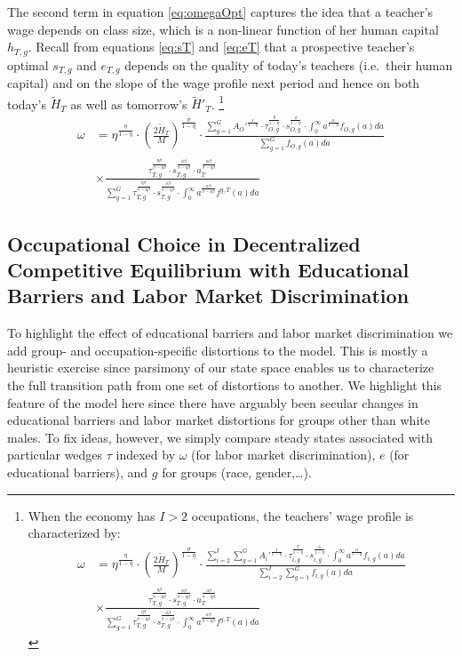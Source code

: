 \documentclass[onehalfspacing,11pt]{article}
\begin{document}
The second term in equation \eqref{eq:omegaOpt} captures the idea that a teacher's wage depends on class size, which is a non-linear function of her human capital $h_{T,g}$. Recall from equations \eqref{eq:sT} and \eqref{eq:eT} that a prospective teacher's optimal $s_{T,g}$ and $e_{T,g}$ depends on the quality of today's teachers (i.e.~their human capital) and on the slope of the wage profile next period and hence on both today's $ \widetilde{H}_{T}$ as well as tomorrow's $\widetilde{H}'_{T}$. \footnote{When the economy has $I>2$ occupations, the teachers' wage profile is characterized by:
\begin{align*}
\omega & = \eta^{\frac{\eta}{1-\eta}}\cdot \left(\tfrac{2\widetilde{H}_T}{M}\right)^{\frac{\sigma}{1-\eta}} \cdot \frac{\sum_{i=2}^I\sum_{g=1}^G {A_i'}^\frac{1}{1-\eta}\cdot\tau_{i,g}^\frac{\eta}{1-\eta} \cdot s_{i,g}^\frac{\phi}{1-\eta}\cdot \int_0^\infty a^{\frac{\alpha}{1-\eta}} f_{i,g}(a)da}{\sum_{i=2}^I\sum_{g=1}^G f_{i,g}(a)da} \nonumber\\
& \times \frac{\tau_{T,g}^\frac{\eta\beta}{\sigma-\eta\beta } \cdot s_{T,g}^\frac{\phi\beta }{\sigma-\eta\beta } \cdot a_T^\frac{\alpha\beta }{\sigma-\eta\beta}}{\sum_{g=1}^G \tau_{T,g}^\frac{\eta\beta }{\sigma-\eta\beta } \cdot s_{T,g}^\frac{\phi\beta }{\sigma-\eta\beta } \cdot \int_0^\infty a^\frac{\alpha\beta}{\sigma-\eta\beta } f^{g,T}(a)da}
\end{align*}
}
\begin{align}
\omega & = \eta^{\frac{\eta}{1-\eta}}\cdot \left(\tfrac{2\widetilde{H}_T}{M}\right)^{\frac{\sigma}{1-\eta}} \cdot \frac{\sum_{g=1}^G {A_O'}^\frac{1}{1-\eta}\cdot\tau_{O,g}^\frac{\eta}{1-\eta} \cdot s_{O,g}^\frac{\phi}{1-\eta}\cdot \int_0^\infty a^{\frac{\alpha}{1-\eta}} f_{O,g}(a)da}{\sum_{g=1}^G f_{O,g}(a)da} \nonumber\\
& \times \frac{\tau_{T,g}^\frac{\eta\beta}{\sigma-\eta\beta } \cdot s_{T,g}^\frac{\phi\beta }{\sigma-\eta\beta } \cdot a_T^\frac{\alpha\beta }{\sigma-\eta\beta}}{\sum_{g=1}^G \tau_{T,g}^\frac{\eta\beta }{\sigma-\eta\beta } \cdot s_{T,g}^\frac{\phi\beta }{\sigma-\eta\beta } \cdot \int_0^\infty a^\frac{\alpha\beta}{\sigma-\eta\beta } f^{g,T}(a)da}
\end{align}

\subsection{Occupational Choice in Decentralized Competitive Equilibrium with Educational Barriers and Labor Market Discrimination}
To highlight the effect of educational barriers and labor market discrimination we add group- and occupation-specific distortions to the model. This is mostly a heuristic exercise since parsimony of our state space enables us to characterize the full transition path from one set of distortions to another. We highlight this feature of the model here since there have arguably been secular changes in educational barriers and labor market distortions for groups other than white males. To fix ideas, however, we simply compare steady states associated with particular wedges $\tau$ indexed by $\omega$ (for labor market discrimination), $e$ (for educational barriers), and $g$ for groups (race, gender,\ldots).
\end{document}
